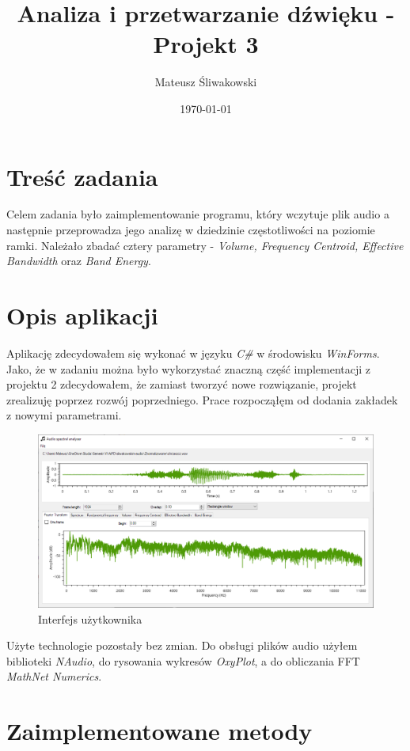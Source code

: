 \documentclass{article}
\title{Analiza i przetwarzanie dźwięku - Projekt 3}
\date{\today}
\author{Mateusz Śliwakowski}
\begin{document}
  \maketitle
  
\section{Treść zadania}
Celem zadania było zaimplementowanie programu, który wczytuje plik audio a następnie przeprowadza jego analizę w dziedzinie częstotliwości na poziomie ramki. Należało zbadać cztery parametry - \textit{Volume, Frequency Centroid, Effective Bandwidth} oraz \textit{Band Energy}.

\section{Opis aplikacji}

Aplikację zdecydowałem się wykonać w języku \textit{C\#} w środowisku \textit{WinForms}. Jako, że w zadaniu można było wykorzystać znaczną część implementacji z projektu 2 zdecydowałem, że zamiast tworzyć nowe rozwiązanie, projekt zrealizuję poprzez rozwój poprzedniego. Prace rozpocząłęm od dodania zakładek z nowymi parametrami.

\begin{figure}[H]
\includegraphics[width=6in]{scr1.png}
\centering
\caption{Interfejs użytkownika}
\end{figure}

\noindent Użyte technologie pozostały bez zmian. Do obsługi plików audio użyłem biblioteki \textit{NAudio}, do rysowania wykresów \textit{OxyPlot}, a do obliczania FFT \textit{MathNet Numerics}.

\section{Zaimplementowane metody}
\end{document}
